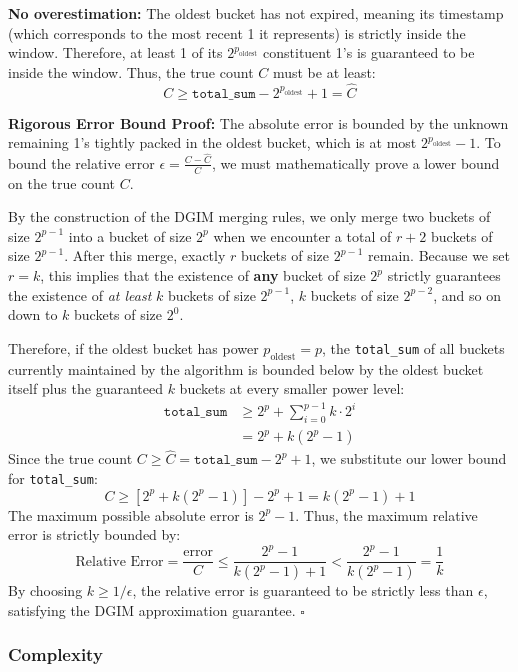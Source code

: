 \documentclass[11pt]{article}
\begin{document}
\textbf{No overestimation:} The oldest bucket has not expired, meaning its timestamp (which corresponds to the most recent 1 it represents) is strictly inside the window. Therefore, at least 1 of its $2^{p_{\text{oldest}}}$ constituent 1's is guaranteed to be inside the window. Thus, the true count $C$ must be at least:
\[
  C \ge \texttt{total\_sum} - 2^{p_{\text{oldest}}} + 1 = \hat{C}
\]

\textbf{Rigorous Error Bound Proof:} 
The absolute error is bounded by the unknown remaining 1's tightly packed in the oldest bucket, which is at most $2^{p_{\text{oldest}}} - 1$. To bound the relative error $\epsilon = \frac{C - \hat{C}}{C}$, we must mathematically prove a lower bound on the true count $C$. 

By the construction of the DGIM merging rules, we only merge two buckets of size $2^{p-1}$ into a bucket of size $2^p$ when we encounter a total of $r + 2$ buckets of size $2^{p-1}$. After this merge, exactly $r$ buckets of size $2^{p-1}$ remain. Because we set $r = k$, this implies that the existence of \textbf{any} bucket of size $2^p$ strictly guarantees the existence of \textit{at least} $k$ buckets of size $2^{p-1}$, $k$ buckets of size $2^{p-2}$, and so on down to $k$ buckets of size $2^0$.

Therefore, if the oldest bucket has power $p_{\text{oldest}} = p$, the \texttt{total\_sum} of all buckets currently maintained by the algorithm is bounded below by the oldest bucket itself plus the guaranteed $k$ buckets at every smaller power level:
\begin{align*}
  \texttt{total\_sum} &\ge 2^p + \sum_{i=0}^{p-1} k \cdot 2^i \\
  &= 2^p + k(2^p - 1)
\end{align*}
Since the true count $C \ge \hat{C} = \texttt{total\_sum} - 2^p + 1$, we substitute our lower bound for \texttt{total\_sum}:
\[
  C \ge \left[ 2^p + k(2^p - 1) \right] - 2^p + 1 = k(2^p - 1) + 1
\]
The maximum possible absolute error is $2^p - 1$. Thus, the maximum relative error is strictly bounded by:
\[
  \text{Relative Error} = \frac{\text{error}}{C} \le \frac{2^p - 1}{k(2^p - 1) + 1} < \frac{2^p - 1}{k(2^p - 1)} = \frac{1}{k}
\]
By choosing $k \ge 1/\epsilon$, the relative error is guaranteed to be strictly less than $\epsilon$, satisfying the DGIM approximation guarantee. \hfill $\square$

\subsubsection*{Complexity}
\end{document}
